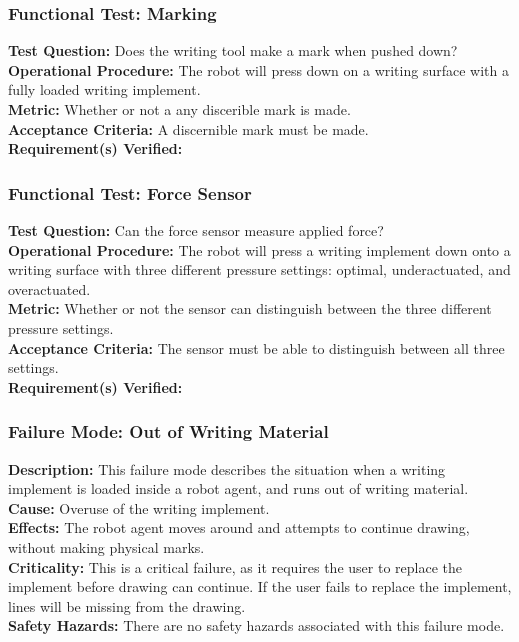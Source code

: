 \subsubsection{Functional Test: Marking}
\label{test:writing_ft_mark}
\textbf{Test Question:} Does the writing tool make a mark when pushed down? \\
\textbf{Operational Procedure:} The robot will press down on a writing surface with a fully loaded writing implement. \\
\textbf{Metric:} Whether or not a any discerible mark is made. \\
\textbf{Acceptance Criteria:} A discernible mark must be made.\\
\textbf{Requirement(s) Verified:} 

\subsubsection{Functional Test: Force Sensor}
\label{test:writing_ft_force}
\textbf{Test Question:} Can the force sensor measure applied force? \\
\textbf{Operational Procedure:} The robot will press a writing implement down onto a writing surface with three different pressure settings: optimal, underactuated, and overactuated.\\
\textbf{Metric:} Whether or not the sensor can distinguish between the three different pressure settings. \\
\textbf{Acceptance Criteria:} The sensor must be able to distinguish between all three settings.\\
\textbf{Requirement(s) Verified:} 


\subsubsection{Failure Mode: Out of Writing Material}
\label{sec:writing_fm_ink}
\textbf{Description:} This failure mode describes the situation when a writing implement is loaded inside a robot agent, and runs out of writing material. \\
\textbf{Cause:} Overuse of the writing implement.\\
\textbf{Effects:} The robot agent moves around and attempts to continue drawing, without making physical marks.\\
\textbf{Criticality:} This is a critical failure, as it requires the user to replace the implement before drawing can continue. If the user fails to replace the implement, lines will be missing from the drawing.\\
\textbf{Safety Hazards:} There are no safety hazards associated with this failure mode.

